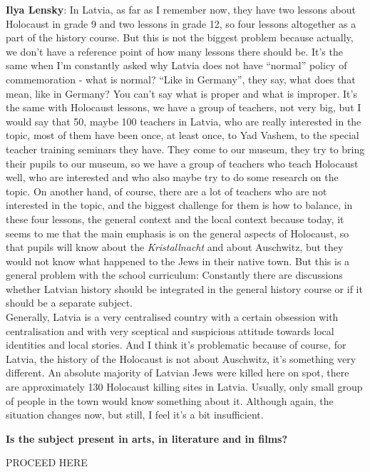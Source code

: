 \textbf{Ilya Lensky}: In Latvia, as far as I remember now, they have two lessons about Holocaust in grade 9 and two lessons in grade 12, so four lessons altogether as a part of the history course. But this is not the biggest problem because actually, we don’t have a reference point of how many lessons there should be. It's the same when I’m constantly asked why Latvia does not have ``normal'' policy of commemoration - what is normal? ``Like in Germany'', they say, what does that mean, like in Germany?  You can’t say what is proper and what is improper. It's the same with Holocaust lessons, we have a group of teachers, not very big, but I would say that 50, maybe 100 teachers in Latvia, who are really interested in the topic, most of them have been once, at least once, to Yad Vashem, to the special teacher training seminars they have. They come to our museum, they try to bring their pupils to our museum, so we have a group of teachers who teach Holocaust well, who are interested and who also maybe try to do some research on the topic. On another hand, of course, there are a lot of teachers who are not interested in the topic, and the biggest challenge for them is how to balance, in these four lessons, the general context and the local context because today, it seems to me that the main emphasis is on the general aspects of Holocaust, so that pupils will know about the \textit{Kristallnacht} and about Auschwitz, but they would not know what happened to the Jews in their native town. But this is a general problem with the school curriculum: Constantly there are discussions whether Latvian history should be integrated in the general history course or if it should be a separate subject.\\
Generally, Latvia is a very centralised country with a certain obsession with centralisation and with very sceptical and suspicious attitude towards local identities and local stories. And I think it’s problematic because of course, for Latvia, the history of the Holocaust is not about Auschwitz, it’s something very different. An absolute majority of Latvian Jews were killed here on spot, there are approximately 130 Holocaust killing sites in Latvia. Usually, only small group of people in the town would know something about it. Although again, the situation changes now, but still, I feel it’s a bit insufficient. 

\textbf{Is the subject present in arts, in literature and in films?} 

PROCEED HERE


